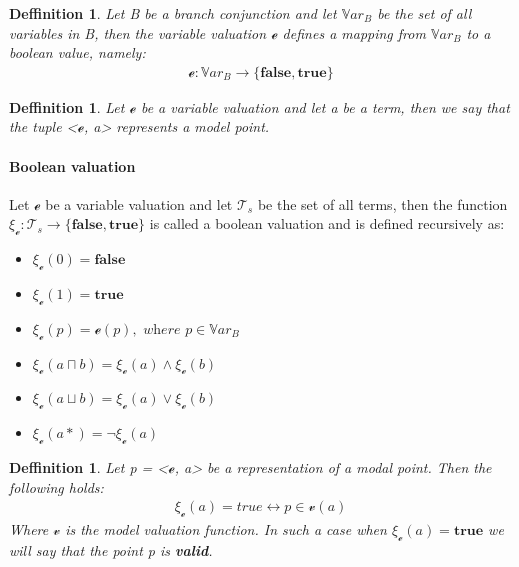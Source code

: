 \documentclass{article}
\newtheorem{defn}[theorem]{Deffinition}
\newcommand{\curvedE}{\mathscr{e}}
\newcommand{\Var}{\mathbb{V}ar}
\newcommand{\vE}{\mathscr{v}}
\newcommand{\vBool}{\xi}
\newcommand{\Ts}{\mathcal{T}_s}
\begin{document}
	\begin{defn}
		Let B be a branch conjunction and let $\Var_B$ be the set of all variables in B, then the variable valuation $\curvedE$ defines a mapping from $\Var_B$ to a boolean value, namely:
		\begin{align*}
			\curvedE : \Var_B \rightarrow \{ \textbf{false}, \textbf{true}\}
		\end{align*}
	\end{defn}


	\begin{defn} 
		Let $\curvedE$ be a variable valuation and let a be a term, then we say that the tuple <$\curvedE$, a> represents a model point.
	\end{defn}

	\paragraph{Boolean valuation}
		Let $\curvedE$ be a variable valuation and let $\Ts$ be the set of all terms,
		then the function $\vBool_{\curvedE} : \Ts \rightarrow \{ \textbf{false}, \textbf{true}\}$ is called a boolean valuation and is defined recursively as:
		\begin{itemize}
			\item $\vBool_{\curvedE}(0) = \textbf{false}$
			\item $\vBool_{\curvedE}(1) = \textbf{true}$
			\item $\vBool_{\curvedE}(p) = \curvedE(p), \textit{ where } p \in \Var_B$
			\item $\vBool_{\curvedE}(a \sqcap b) = \vBool_{\curvedE}(a) \land \vBool_{\curvedE}(b)$
			\item $\vBool_{\curvedE}(a \sqcup b) = \vBool_{\curvedE}(a) \lor \vBool_{\curvedE}(b)$
			\item $\vBool_{\curvedE}(a*) = \neg \vBool_{\curvedE}(a)$
		\end{itemize}


	\begin{defn}
		Let p = <$\curvedE$, a> be a representation of a modal point. Then the following holds:
		\begin{align*}
			\vBool_{\curvedE}(a) = true \leftrightarrow p \in \vE(a)
		\end{align*}
		Where $\vE$ is the model valuation function. In such a case when $\vBool_{\curvedE}(a) = \textbf{true}$ we will say that the point p is \textbf{valid}.
	\end{defn}
	
\end{document}
